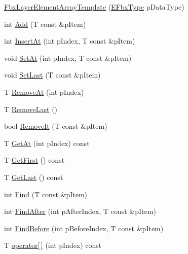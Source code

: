 \begin{DoxyCompactItemize}
\item 
\hyperlink{class_fbx_layer_element_array_template_a624afc7ae56a5caacacd69bcb8bf9ba8}{Fbx\+Layer\+Element\+Array\+Template} (\hyperlink{fbxpropertytypes_8h_a73913a5ddfb20e57c6f25e9e6784bd92}{E\+Fbx\+Type} p\+Data\+Type)
\item 
int \hyperlink{class_fbx_layer_element_array_template_acc403e924944fe9921dac121156bf963}{Add} (T const \&p\+Item)
\item 
int \hyperlink{class_fbx_layer_element_array_template_adaf1260a3a9f1c68f9809ddaf051ac61}{Insert\+At} (int p\+Index, T const \&p\+Item)
\item 
void \hyperlink{class_fbx_layer_element_array_template_a70cf4f9a1b142eff8adae13ad1a79e6d}{Set\+At} (int p\+Index, T const \&p\+Item)
\item 
void \hyperlink{class_fbx_layer_element_array_template_a90c76493799f15b6345c83dc242f7b7c}{Set\+Last} (T const \&p\+Item)
\item 
T \hyperlink{class_fbx_layer_element_array_template_a2ebd201d3d664e9b171d50561bfad1de}{Remove\+At} (int p\+Index)
\item 
T \hyperlink{class_fbx_layer_element_array_template_ac5f508f41799c5f3f2e0c045ab874063}{Remove\+Last} ()
\item 
bool \hyperlink{class_fbx_layer_element_array_template_abecc76d8203687b7963f2c4fa2d43a1e}{Remove\+It} (T const \&p\+Item)
\item 
T \hyperlink{class_fbx_layer_element_array_template_a68180d4ec375c231a49ce117503a1aa8}{Get\+At} (int p\+Index) const
\item 
T \hyperlink{class_fbx_layer_element_array_template_a76cc225d2f45a40ef77ecce9bb1dd971}{Get\+First} () const
\item 
T \hyperlink{class_fbx_layer_element_array_template_a3dc0296d72de9a084d5afedaba6f5900}{Get\+Last} () const
\item 
int \hyperlink{class_fbx_layer_element_array_template_a60e464ae7d193fa397d2099c760482d6}{Find} (T const \&p\+Item)
\item 
int \hyperlink{class_fbx_layer_element_array_template_a76bad491c68ab608c7f07daf7e659bfe}{Find\+After} (int p\+After\+Index, T const \&p\+Item)
\item 
int \hyperlink{class_fbx_layer_element_array_template_a27a66a52ff1642fd6a5ed7c34d72c3c7}{Find\+Before} (int p\+Before\+Index, T const \&p\+Item)
\item 
T \hyperlink{class_fbx_layer_element_array_template_a1307ade46b3db83ed5cec97e2449f0de}{operator\mbox{[}$\,$\mbox{]}} (int p\+Index) const

\end{DoxyCompactItemize}

